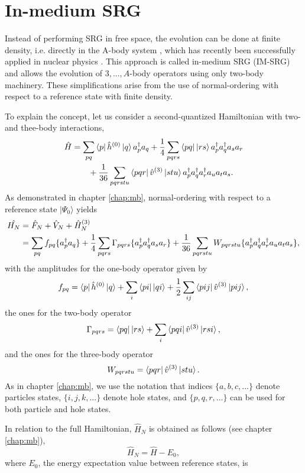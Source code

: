 \section{In-medium SRG}
Instead of performing SRG in free space, the evolution can be done at finite density, i.e. directly in the A-body system \cite{kehrein2006flow}, which has recently been successfully applied in nuclear physics \cite{IMSRG,Koshi}. 
This approach is called in-medium SRG (IM-SRG) and allows the evolution of 
 $3,...,A$-body operators using only two-body machinery. These simplifications arise from the use of normal-ordering with respect to a reference state with finite density.

To explain the concept, let us consider a second-quantized Hamiltonian with two- and thee-body interactions,
\begin{align}
\hat{H} & = \sum\limits_{pq}\left\langle p \right| \hat{h}^{(0)} \left| q \right\rangle a_p^\dagger a_q + \frac{1}{4}\sum\limits_{pqrs}\left\langle pq \right|\left| r s \right\rangle a_p^\dagger a_q^\dagger a_s a_r \notag \\
 & \qquad + \frac{1}{36}\sum_{pqrstu} \left\langle pqr \right|\hat{v}^{(3)}\left| stu \right\rangle a_p^\dagger a_q^\dagger a_r^\dagger a_u a_t a_s . \notag
\end{align} 
As demonstrated in chapter \ref{chap:mb}, normal-ordering with respect to a reference state $|\Psi_0\rangle$ yields 
\begin{align*}
\hat{H_N} &= \hat{F}_N + \hat{V}_N + \hat{H}_N^{(3)}\\
&= \sum\limits_{pq}f_{pq}\lbrace a_p^\dagger a_q\rbrace + \frac{1}{4}\sum\limits_{pqrs}\Gamma_{pqrs} \lbrace a_p^\dagger a_q^\dagger a_s a_r \rbrace + \frac{1}{36}\sum\limits_{pqrstu} W_{pqrstu} \lbrace a_p^\dagger a_q^\dagger a_r^\dagger a_u a_t a_s\rbrace ,
\end{align*}
with the amplitudes for the one-body operator given by
\[
f_{pq} = \left\langle p \right|\hat{h}^{(0)}\left| q \right\rangle + \sum\limits_i \left\langle pi \right| \left| qi\right\rangle + \frac{1}{2}\sum\limits_{ij}\left\langle pij\right|\hat{v}^{(3)}\left| pij\right\rangle,
\]
the ones for the two-body operator
\[
\Gamma_{pqrs} = \left\langle pq \right| \left| r s \right\rangle + \sum\limits_i \left\langle p q i \right| \hat{v}^{(3)}\left| rsi \right\rangle,
\]
and the ones for the three-body operator
\[
W_{pqrstu} =  \left\langle pqr\right|\hat{v}^{(3)}\left|stu\right\rangle.
\]
As in chapter \ref{chap:mb}, we use the notation that indices $\lbrace a,b,c,...\rbrace$ denote particles states, $\lbrace i,j,k,... \rbrace$ denote hole states, and $\lbrace p,q,r,...\rbrace$ can be used for both particle and hole states. 

In relation to the full Hamiltonian, $\hat{H}_N$ is obtained as follows (see chapter \ref{chap:mb}),
\[
\hat{H}_N = \hat{H} - E_0,
\]
where $E_0$, the energy expectation value between reference states, is 

